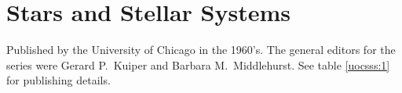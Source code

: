\section{Stars and Stellar Systems}

Published by the University of Chicago in the 1960's. The general
editors for the series were Gerard P.\ Kuiper and Barbara M.\ Middlehurst.
See table \ref{uocsss:1} for publishing details.

